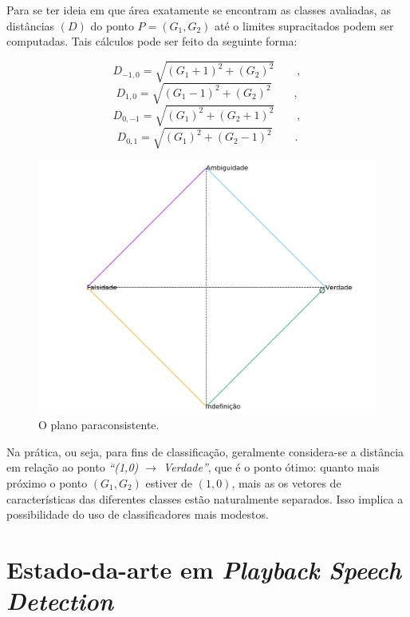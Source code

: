 			\par Para se ter ideia em que área exatamente se encontram as classes avaliadas, as distâncias $(D)$ do ponto $P=(G_1,G_2)$ até o limites supracitados podem ser computadas. Tais cálculos pode ser feito da seguinte forma:

			\begin{equation}
				D_{-1,0}=\sqrt{(G_1+1)^2+(G_2)^2}\qquad,
			\end{equation}
			\begin{equation}
				D_{1,0}=\sqrt{(G_1-1)^2+(G_2)^2}\qquad,
			\end{equation}
			\begin{equation}
				D_{0,-1}=\sqrt{(G_1)^2+(G_2+1)^2}\qquad,		
			\end{equation}
			\begin{equation}
				D_{0,1}=\sqrt{(G_1)^2+(G_2-1)^2}\qquad.
			\end{equation}		

			\begin{figure}[h]
				\centering
				\includegraphics[width=0.69\linewidth]{images/paraconsistentPlane.pdf}
				\caption{O plano paraconsistente.}
				\label{fig:paraconsistentplane}
			\end{figure}
		
		\par Na prática, ou seja, para fins de classificação, geralmente considera-se a distância em relação ao ponto \textit{``(1,0) $\rightarrow$ Verdade''}, que é o ponto ótimo: quanto mais próximo o ponto $(G_1,G_2)$ estiver de $(1,0)$, mais as os vetores de características das diferentes classes estão naturalmente separados. Isso implica a possibilidade do uso de classificadores mais modestos. 
		
	\section{Estado-da-arte em \textit{Playback Speech Detection}}
	
